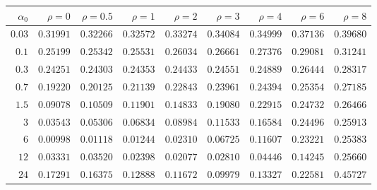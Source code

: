 \begin{tabular}{rrrrrrrrr}
\hline
$\alpha_0$ & $\rho=0$ & $\rho=0.5$ & $\rho=1$ & $\rho=2$ & $\rho=3$ & $\rho=4$ & $\rho=6$ & $\rho=8$ \\
\hline
$0.03$ & $0.31991$ & $0.32266$ & $0.32572$ & $0.33274$ & $0.34084$ & $0.34999$ & $0.37136$ & $0.39680$ \\
$0.1$ & $0.25199$ & $0.25342$ & $0.25531$ & $0.26034$ & $0.26661$ & $0.27376$ & $0.29081$ & $0.31241$ \\
$0.3$ & $0.24251$ & $0.24303$ & $0.24353$ & $0.24433$ & $0.24551$ & $0.24889$ & $0.26444$ & $0.28317$ \\
$0.7$ & $0.19220$ & $0.20125$ & $0.21139$ & $0.22843$ & $0.23961$ & $0.24394$ & $0.25354$ & $0.27185$ \\
$1.5$ & $0.09078$ & $0.10509$ & $0.11901$ & $0.14833$ & $0.19080$ & $0.22915$ & $0.24732$ & $0.26466$ \\
$3$ & $0.03543$ & $0.05306$ & $0.06834$ & $0.08984$ & $0.11533$ & $0.16584$ & $0.24496$ & $0.25913$ \\
$6$ & $\mathbf{0.00998}$ & $0.01118$ & $0.01244$ & $0.02310$ & $0.06725$ & $0.11607$ & $0.23221$ & $0.25383$ \\
$12$ & $0.03331$ & $0.03520$ & $0.02398$ & $0.02077$ & $0.02810$ & $0.04446$ & $0.14245$ & $0.25660$ \\
$24$ & $0.17291$ & $0.16375$ & $0.12888$ & $0.11672$ & $0.09979$ & $0.13327$ & $0.22581$ & $0.45727$ \\
\hline
\end{tabular}
